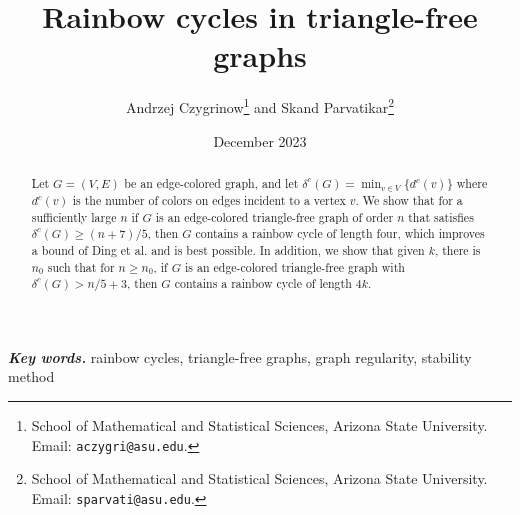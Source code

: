 \documentclass{article}
\title{Rainbow cycles in triangle-free graphs}
\author{Andrzej Czygrinow\thanks{School of Mathematical and Statistical Sciences, Arizona State University. Email: {\tt  aczygri@asu.edu}.} and 
Skand Parvatikar\thanks{School of Mathematical and Statistical Sciences, Arizona State University. Email: {\tt  sparvati@asu.edu}.}}
\date{December 2023}
\providecommand{\keywords}[1]{\textbf{\textit{Key words.}} #1}
\begin{document}
\maketitle
\begin{abstract}
Let $G = (V,E)$ be an edge-colored graph, and let $\delta^c(G) = \min_{v \in V} \{ d^{c}(v) \}$ where $d^c(v)$ is the number of colors on edges incident to a vertex $v$.  
We show that for a sufficiently large $n$ if $G$ is an edge-colored triangle-free graph of order $n$ that satisfies $\delta^c(G)\geq (n+7)/5$, then $G$ contains a rainbow cycle of length four, which improves a bound of Ding et al. and is best possible. In addition, we show that given $k$, there is $n_0$ such that for $n\geq n_0$, if $G$ is an edge-colored triangle-free graph with $\delta^c(G)> n/5+3$, then $G$ contains a rainbow cycle of length $4k$. 
\end{abstract}

\keywords{rainbow cycles, triangle-free graphs, graph regularity, {stability method}}
\end{document}
